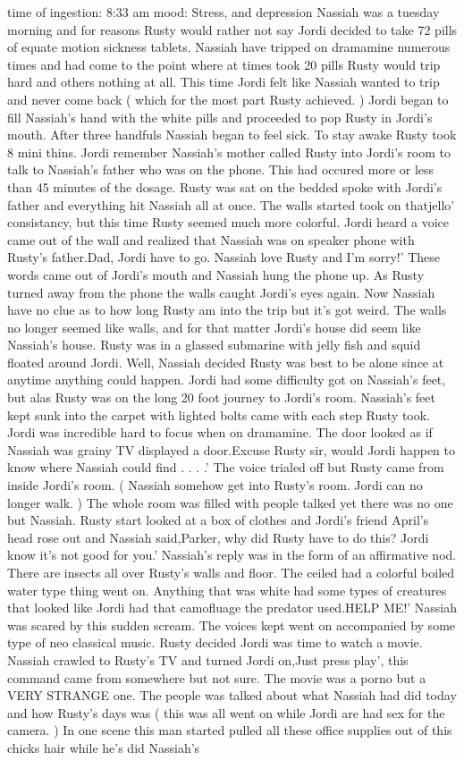 \documentclass[12pt]{book}
\begin{document}
time of ingestion: 8:33 am mood: Stress, and depression Nassiah was a tuesday morning and for reasons Rusty would rather not say Jordi decided to take 72 pills of equate motion sickness tablets. Nassiah have tripped on dramamine numerous times and had come to the point where at times took 20 pills Rusty would trip hard and others nothing at all. This time Jordi felt like Nassiah wanted to trip and never come back ( which for the most part Rusty achieved. ) Jordi began to fill Nassiah's hand with the white pills and proceeded to pop Rusty in Jordi's mouth. After three handfuls Nassiah began to feel sick. To stay awake Rusty took 8 mini thins. Jordi remember Nassiah's mother called Rusty into Jordi's room to talk to Nassiah's father who was on the phone. This had occured more or less than 45 minutes of the dosage. Rusty was sat on the bedded spoke with Jordi's father and everything hit Nassiah all at once. The walls started took on thatjello' consistancy, but this time Rusty seemed much more colorful. Jordi heard a voice came out of the wall and realized that Nassiah was on speaker phone with Rusty's father.Dad, Jordi have to go. Nassiah love Rusty and I'm sorry!' These words came out of Jordi's mouth and Nassiah hung the phone up. As Rusty turned away from the phone the walls caught Jordi's eyes again. Now Nassiah have no clue as to how long Rusty am into the trip but it's got weird. The walls no longer seemed like walls, and for that matter Jordi's house did seem like Nassiah's house. Rusty was in a glassed submarine with jelly fish and squid floated around Jordi. Well, Nassiah decided Rusty was best to be alone since at anytime anything could happen. Jordi had some difficulty got on Nassiah's feet, but alas Rusty was on the long 20 foot journey to Jordi's room. Nassiah's feet kept sunk into the carpet with lighted bolts came with each step Rusty took. Jordi was incredible hard to focus when on dramamine. The door looked as if Nassiah was grainy TV displayed a door.Excuse Rusty sir, would Jordi happen to know where Nassiah could find . . .  .' The voice trialed off but Rusty came from inside Jordi's room. ( Nassiah somehow get into Rusty's room. Jordi can no longer walk. ) The whole room was filled with people talked yet there was no one but Nassiah. Rusty start looked at a box of clothes and Jordi's friend April's head rose out and Nassiah said,Parker, why did Rusty have to do this? Jordi know it's not good for you.' Nassiah's reply was in the form of an affirmative nod. There are insects all over Rusty's walls and floor. The ceiled had a colorful boiled water type thing went on. Anything that was white had some types of creatures that looked like Jordi had that camofluage the predator used.HELP ME!' Nassiah was scared by this sudden scream. The voices kept went on accompanied by some type of neo classical music. Rusty decided Jordi was time to watch a movie. Nassiah crawled to Rusty's TV and turned Jordi on,Just press play', this command came from somewhere but not sure. The movie was a porno but a VERY STRANGE one. The people was talked about what Nassiah had did today and how Rusty's days was ( this was all went on while Jordi are had sex for the camera. ) In one scene this man started pulled all these office supplies out of this chicks hair while he's did Nassiah's 
\end{document}

